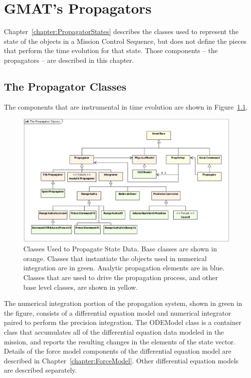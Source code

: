 \chapter{\label{chapter:Propagators}GMAT's Propagators}

Chapter~\ref{chapter:PropagatorStates} describes the classes used to represent the state of the
objects in a Mission Control Sequence, but does not define the pieces that perform the time
evolution for that state.  Those components -- the propagators -- are described in this chapter.

\section{The Propagator Classes}

The components that are instrumental in time evolution are shown in
Figure~\ref{figure:PropagatorClasses}.

\begin{figure}[htb]
\begin{center}
\includegraphics[scale=0.5]{Images/ThePropagatorClasses.eps}
\caption[Classes Used to Propagate State Data]{\label{figure:PropagatorClasses}Classes Used
to Propagate State Data.  Base classes are shown in orange.  Classes that instantiate the objects
used in numerical integration are in green.  Analytic propagation elements are in blue.  Classes
that are used to drive the propagation process, and other base level classes, are shown in yellow.}
\end{center}
\end{figure}

The numerical integration portion of the propagation system, shown in green in the figure, consists
of a differential equation model and numerical integrator paired to perform the precision
integration. The ODEModel class is a container class that accumulates all of the differential
equation data modeled in the mission, and reports the resulting changes in the elements of the
state vector. Details of the force model components of the differential equation model are described
in Chapter~\ref{chapter:ForceModel}.  Other differential equation models are described separately.

